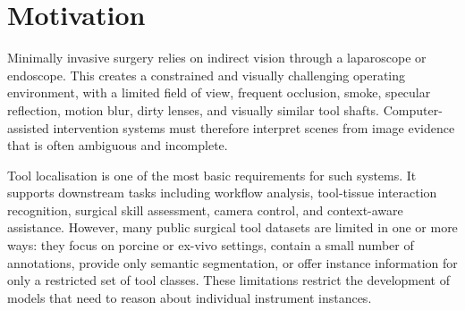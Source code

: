 \section{Motivation}
\label{sec:cholecinstanceseg-motivation}

Minimally invasive surgery relies on indirect vision through a laparoscope or endoscope. This creates a constrained and visually challenging operating environment, with a limited field of view, frequent occlusion, smoke, specular reflection, motion blur, dirty lenses, and visually similar tool shafts. Computer-assisted intervention systems must therefore interpret scenes from image evidence that is often ambiguous and incomplete.

Tool localisation is one of the most basic requirements for such systems. It supports downstream tasks including workflow analysis, tool-tissue interaction recognition, surgical skill assessment, camera control, and context-aware assistance. However, many public surgical tool datasets are limited in one or more ways: they focus on porcine or ex-vivo settings, contain a small number of annotations, provide only semantic segmentation, or offer instance information for only a restricted set of tool classes. These limitations restrict the development of models that need to reason about individual instrument instances.

\begin{table}[ht]
\centering
{}
\caption{Comparison of representative datasets used in surgical tool segmentation research. CholecInstanceSeg provides instance-level annotations at a larger scale than the listed alternatives while focusing on routine human laparoscopic cholecystectomy.}
\label{tab:cholecinstanceseg-dataset-comparison}
\end{table}

